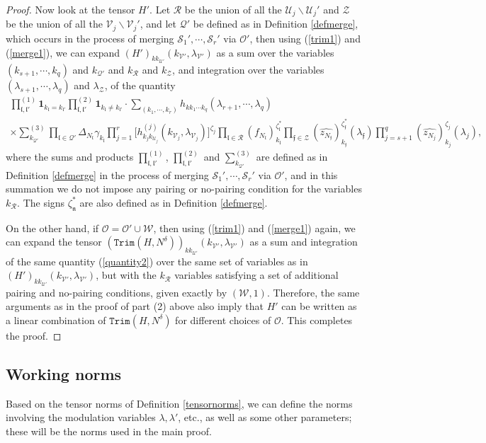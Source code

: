 \documentclass[11 pt,reqno]{amsart}
\theoremstyle{definition}
\theoremstyle{remark}
\numberwithin{equation}{section}
\newcommand{\Sc}{\mathcal{S}}
\newcommand{\Qc}{\mathcal{Q}}
\newcommand{\Rc}{\mathcal{R}}
\newcommand{\Uc}{\mathcal{U}}
\newcommand{\Vc}{\mathcal{V}}
\newcommand{\Zc}{\mathcal{Z}}
\newcommand{\ff}{\mathfrak{f}}
\newcommand{\lf}{\mathfrak{l}}
\newcommand{\Os}{\mathscr{O}}
\newcommand{\Ws}{\mathscr{W}}
\begin{document}
{\begin{proof}
Now look at the tensor $H'$. Let $\Rc$ be the union of all the $\Uc_j\backslash\Uc_j'$ and $\Zc$ be the union of all the $\Vc_j\backslash\Vc_j'$, and let $\Qc'$ be defined as in Definition \ref{defmerge}, which occurs in the process of merging $\Sc_1',\cdots, \Sc_r'$ via $\Os'$, then using (\ref{trim1}) and (\ref{merge1}), we can expand $(H')_{kk_{\Uc'}}(k_{\Vc'},\lambda_{\Vc'})$ as a sum over the variables $(k_{s+1},\cdots,k_q)$ and $k_{\Qc'}$ and $k_\Rc$ and $k_{\Zc}$, and integration over the variables $(\lambda_{s+1},\cdots,\lambda_q)$ and $\lambda_{\Zc}$, of the quantity
 \begin{multline}\label{quantity2}
 \prod_{\lf,\lf'}^{(1)}\mathbf{1}_{k_\lf=k_{\lf'}}\prod_{\lf,\lf'}^{(2)}\mathbf{1}_{k_\lf\neq k_{\lf'}}\cdot \sum_{(k_1,\cdots,k_r)}h_{kk_1\cdots k_q}(\lambda_{r+1},\cdots,\lambda_q)\\\times\sum_{k_{\Qc'}}^{(3)}\prod_{\lf\in\Qc'}\Delta_{N_\lf}\gamma_{k_\lf}\prod_{j=1}^{r}\big[h_{k_jk_{\Uc_j}}^{(j)}(k_{\Vc_j},\lambda_{\Vc_j})\big]^{\zeta_j}\prod_{\lf\in\Rc}(f_{N_\lf})_{k_{\lf}}^{\zeta_\lf^*}\prod_{\ff\in\Zc}(\widehat{z_{N_\ff}})_{k_\ff}^{\zeta_\ff^*}(\lambda_\ff)\prod_{j=s+1}^q(\widehat{z_{N_j}})_{k_j}^{\zeta_j}(\lambda_j),
 \end{multline} where the sums and products $\prod_{\lf,\lf'}^{(1)}$, $\prod_{\lf,\lf'}^{(2)}$ and $\sum_{k_{\Qc'}}^{(3)}$ are defined as in Definition \ref{defmerge} in the process of merging $\Sc_1',\cdots, \Sc_r'$ via $\Os'$, and in this summation we do not impose any pairing or no-pairing condition for the variables $k_{\Rc}$. The signs $\zeta_{\mathfrak{n}}^*$ are also defined as in Definition \ref{defmerge}.
 
 On the other hand, if $\Os=\Os'\cup\Ws$, then using (\ref{trim1}) and (\ref{merge1}) again, we can expand the tensor $(\mathtt{Trim}(H,N^\delta))_{kk_{\Uc'}}(k_{\Vc'},\lambda_{\Vc'})$ as a sum and integration of the same quantity (\ref{quantity2}) over the same set of variables as in $(H')_{kk_{\Uc'}}(k_{\Vc'},\lambda_{\Vc'})$, but with the $k_\Rc$ variables satisfying a set of additional pairing and no-pairing conditions, given exactly by $(\Ws,1)$. Therefore, the same arguments as in the proof of part (2) above also imply that $H'$ can be written as a linear combination of $\mathtt{Trim}(H,N^\delta)$ for different choices of $\Os$. This completes the proof.
 \end{proof}
 \subsection{Working norms}\label{globalnorms} Based on the tensor norms of Definition \ref{tensornorms}, we can define the norms involving the modulation variables $\lambda,\lambda'$, etc., as well as some other parameters; these will be the norms used in the main proof.
 
}
\end{document}
